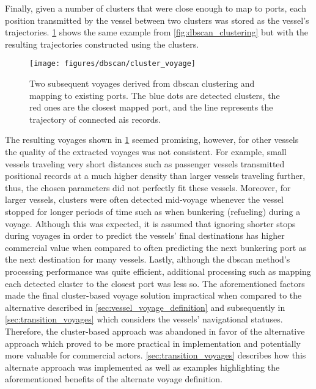 Finally, given a number of clusters that were close enough to map to ports, each position transmitted by the vessel between two clusters was stored as the vessel's trajectories. \cref{fig:clustered_trajectories} shows the same example from \cref{fig:dbscan_clustering} but with the resulting trajectories constructed using the clusters.

\begin{figure}[htbp]
    \centering
    \texttt{[image: figures/dbscan/cluster\_voyage]}
    \caption{Two subsequent voyages derived from \acrshort{dbscan} clustering and mapping to existing ports. The blue dots are detected clusters, the red ones are the closest mapped port, and the line represents the trajectory of connected \acrshort{ais} records.}
    \label{fig:clustered_trajectories}
\end{figure}

The resulting voyages shown in \cref{fig:clustered_trajectories} seemed promising, however, for other vessels the quality of the extracted voyages was not consistent. For example, small vessels traveling very short distances such as passenger vessels transmitted positional records at a much higher density than larger vessels traveling further, thus, the chosen parameters did not perfectly fit these vessels. Moreover, for larger vessels, clusters were often detected mid-voyage whenever the vessel stopped for longer periods of time such as when bunkering (refueling) during a voyage. Although this was expected, it is assumed that ignoring shorter stops during voyages in order to predict the vessels' final destinations has higher commercial value when compared to often predicting the next bunkering port as the next destination for many vessels. Lastly, although the \acrshort{dbscan} method's processing performance was quite efficient, additional processing such as mapping each detected cluster to the closest port was less so. The aforementioned factors made the final cluster-based voyage solution impractical when compared to the alternative described in \cref{sec:vessel_voyage_definition} and subsequently in \cref{sec:transition_voyages} which considers the vessels' navigational statuses. Therefore, the cluster-based approach was abandoned in favor of the alternative approach which proved to be more practical in implementation and potentially more valuable for commercial actors. \cref{sec:transition_voyages} describes how this alternate approach was implemented as well as examples highlighting the aforementioned benefits of the alternate voyage definition.

